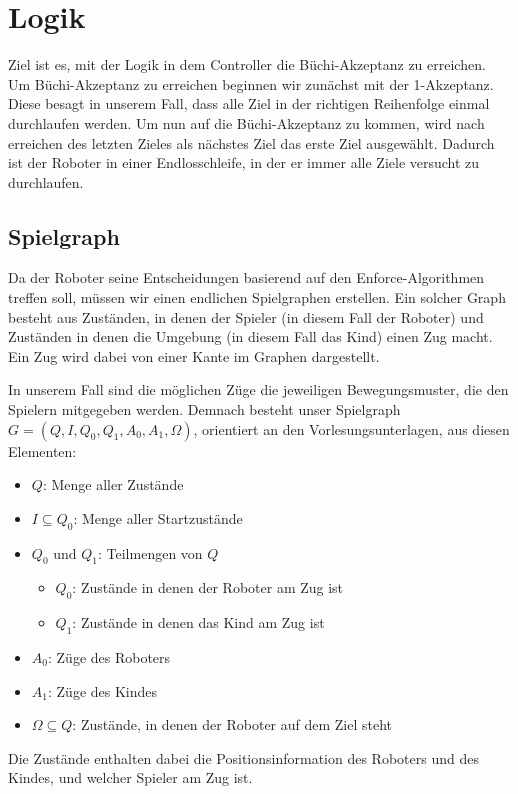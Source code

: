 \section{Logik}
Ziel ist es, mit der Logik in dem Controller die Büchi-Akzeptanz zu erreichen.
Um Büchi-Akzeptanz zu erreichen beginnen wir zunächst mit der 1-Akzeptanz. Diese besagt in unserem Fall, dass alle Ziel in der richtigen Reihenfolge einmal durchlaufen werden. Um nun auf die Büchi-Akzeptanz zu kommen, wird nach erreichen des letzten Zieles als nächstes Ziel das erste Ziel ausgewählt. Dadurch ist der Roboter in einer Endlosschleife, in der er immer alle Ziele versucht zu durchlaufen.
\subsection{Spielgraph}
Da der Roboter seine Entscheidungen basierend auf den Enforce-Algorithmen treffen soll, müssen wir einen endlichen
Spielgraphen erstellen. Ein solcher Graph besteht aus Zuständen, in denen der Spieler (in diesem Fall der Roboter)
und Zuständen in denen die Umgebung (in diesem Fall das Kind) einen Zug macht. Ein Zug wird dabei von einer Kante im Graphen
dargestellt.\par

In unserem Fall sind die möglichen Züge die jeweiligen Bewegungsmuster, die den Spielern mitgegeben werden.
Demnach besteht unser Spielgraph $G = (Q, I, Q_0, Q_1, A_0, A_1, \Omega)$, orientiert an den Vorlesungsunterlagen, aus diesen Elementen:
\begin{itemize}
	\item $Q$: Menge aller Zustände
	\item $I \subseteq Q_0$: Menge aller Startzustände
	\item $Q_0  \text{ und }  Q_1$: Teilmengen von $Q$
	\begin{itemize}
		\item $Q_0$: Zustände in denen der Roboter am Zug ist
		\item $Q_1$: Zustände in denen das Kind am Zug ist
	\end{itemize}
	\item $A_0$: Züge des Roboters
	\item $A_1$: Züge des Kindes
	\item $\Omega \subseteq Q$: Zustände, in denen der Roboter auf dem Ziel steht
\end{itemize}

Die Zustände enthalten dabei die Positionsinformation des Roboters und des Kindes, und welcher Spieler am Zug ist.

